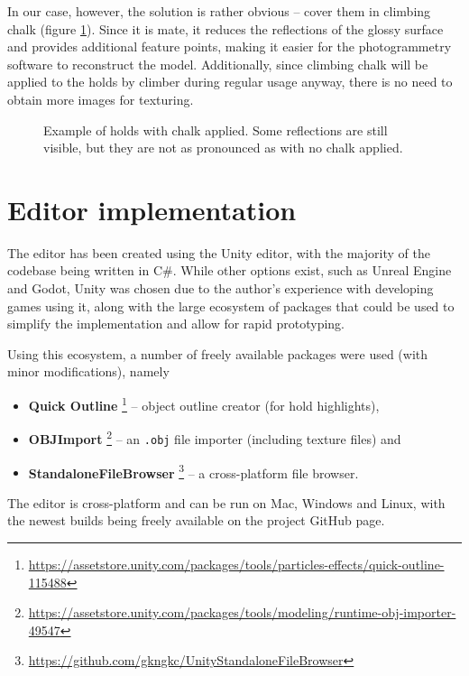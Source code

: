 In our case, however, the solution is rather obvious -- cover them in climbing chalk (figure \ref{fig:chalk}).
Since it is mate, it reduces the reflections of the glossy surface and provides additional feature points, making it easier for the photogrammetry software to reconstruct the model.
Additionally, since climbing chalk will be applied to the holds by climber during regular usage anyway, there is no need to obtain more images for texturing.

\begin{figure}[H]
	\centering
	\hfill
	\hfill
	\caption{Example of holds with chalk applied. Some reflections are still visible, but they are not as pronounced as with no chalk applied.}%
	\label{fig:chalk}
\end{figure}

\section{Editor implementation}
The editor has been created using the Unity editor, with the majority of the codebase being written in C\#.
While other options exist, such as Unreal Engine and Godot, Unity was chosen due to the author's experience with developing games using it, along with the large ecosystem of packages that could be used to simplify the implementation and allow for rapid prototyping.

Using this ecosystem, a number of freely available packages were used (with minor modifications), namely

\begin{itemize}
	\item \textbf{Quick Outline} \footnote{\url{https://assetstore.unity.com/packages/tools/particles-effects/quick-outline-115488}} -- object outline creator (for hold highlights),
	\item \textbf{OBJImport} \footnote{\url{https://assetstore.unity.com/packages/tools/modeling/runtime-obj-importer-49547}} -- an \verb|.obj| file importer (including texture files) and
	\item \textbf{StandaloneFileBrowser} \footnote{\url{https://github.com/gkngkc/UnityStandaloneFileBrowser}} -- a cross-platform file browser.
\end{itemize}

The editor is cross-platform and can be run on Mac, Windows and Linux, with the newest builds being freely available on the project GitHub page.

